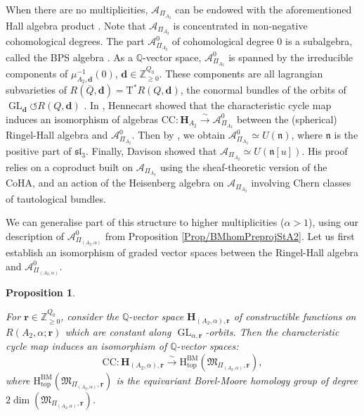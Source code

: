 \documentclass[11pt,english]{article}
\numberwithin{equation}{section}
\numberwithin{figure}{section}
\theoremstyle{definition}
\theoremstyle{plain}
\newtheorem{prop}[df]{Proposition}
\theoremstyle{remark}
\DeclareMathOperator{\GL}{GL}
\newcommand\dd{\mathbf{d}}
\newcommand\rr{\mathbf{r}}
\newcommand\HH{\mathrm{H}}
\newcommand\ZZ{\mathbb{Z}}
\newcommand\QQ{\mathbb{Q}}
\begin{document}
When there are no multiplicities, $\mathcal{A}_{\Pi_{A_{2}}}$ can
be endowed with the aforementioned Hall algebra product \cite{SV13b,YZ18a}.
Note that $\mathcal{A}_{\Pi_{A_{2}}}$ is concentrated in non-negative
cohomological degrees. The part $\mathcal{A}_{\Pi_{A_{2}}}^{0}$ of
cohomological degree 0 is a subalgebra, called the BPS algebra \cite{Dav20}.
As a $\QQ$-vector space, $\mathcal{A}_{\Pi_{A_{2}}}^{0}$ is spanned
by the irreducible components of $\mu_{A_{2},\dd}^{-1}(0)$, $\dd\in\ZZ_{\geq0}^{Q_{0}}$.
These components are all lagrangian subvarieties of $R(\overline{Q},\dd)=\mathrm{T}^{*}R(Q,\dd)$,
the conormal bundles of the orbits of $\GL_{\dd}\circlearrowleft R(Q,\dd)$
\cite[Exmp. 4.10.]{S12b}. In \cite{Hen24}, Hennecart showed that
the characteristic cycle map induces an isomorphism of algebras $\mathrm{CC}:\mathbf{H}_{A_{2}}\overset{\sim}{\longrightarrow}\mathcal{A}_{\Pi_{A_{2}}}^{0}$
between the (spherical) Ringel-Hall algebra and $\mathcal{A}_{\Pi_{A_{2}}}^{0}$.
Then by \cite[Prop. 10.20.]{Lus91}, we obtain $\mathcal{A}_{\Pi_{A_{2}}}^{0}\simeq U(\mathfrak{n})$,
where $\mathfrak{n}$ is the positive part of $\mathfrak{sl}_{3}$.
Finally, Davison showed \cite[Prop. 3.7, 3.14.]{Dav22} that $\mathcal{A}_{\Pi_{A_{2}}}\simeq U(\mathfrak{n}[u])$.
His proof relies on a coproduct built on $\mathcal{A}_{\Pi_{A_{2}}}$
using the sheaf-theoretic version of the CoHA, and an action of the
Heisenberg algebra on $\mathcal{A}_{\Pi_{A_{2}}}$ involving Chern
classes of tautological bundles.

We can generalise part of this structure to higher multiplicities
($\alpha>1$), using our description of $\mathcal{A}_{\Pi_{(A_{2},\alpha)}}^{0}$
from Proposition \ref{Prop/BMhomPreprojStA2}. Let us first establish
an isomorphism of graded vector spaces between the Ringel-Hall algebra
and $\mathcal{A}_{\Pi_{(A_{2},\alpha)}}^{0}$.

\begin{prop} \label{Prop/CCiso}

For $\rr\in\ZZ_{\geq0}^{Q_{0}}$, consider the $\QQ$-vector space
$\mathbf{H}_{(A_{2},\alpha),\rr}$ of constructible functions on $R(A_{2},\alpha;\rr)$
which are constant along $\GL_{\alpha,\rr}$-orbits. Then the characteristic
cycle map induces an isomorphism of $\QQ$-vector spaces:\[
\mathrm{CC}:
\mathbf{H}_{(A_{2},\alpha),\rr}
\overset{\sim}{\longrightarrow}
\HH_{\mathrm{top}}^{\mathrm{BM}}\left(\mathfrak{M}_{\Pi_{(A_{2},\alpha)},\rr}\right)
,
\]where $\HH_{\mathrm{top}}^{\mathrm{BM}}\left(\mathfrak{M}_{\Pi_{(A_{2},\alpha)},\rr}\right)$
is the equivariant Borel-Moore homology group of degree $2\dim\left(\mathfrak{M}_{\Pi_{(A_{2},\alpha)},\rr}\right)$.

\end{prop}
\end{document}
